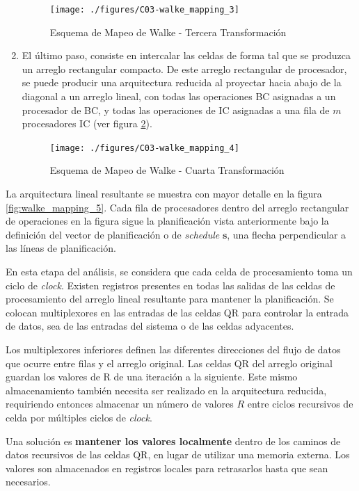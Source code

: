 \begin{enumerate}
	\begin{figure}[h!]
        \centering
        \texttt{[image: ./figures/C03-walke\_mapping\_3]}
        \caption{Esquema de Mapeo de Walke - Tercera Transformación}
        \label{fig:walke_mapping_3}
	\end{figure}

	\item  El último paso, consiste en intercalar las celdas de forma tal que se produzca un arreglo rectangular compacto. De este arreglo rectangular de procesador, se puede producir una arquitectura reducida al proyectar hacia abajo de la diagonal a un arreglo lineal, con todas las operaciones BC asignadas a un procesador de BC, y todas las operaciones de IC asignadas a una fila de $m$ procesadores IC (ver figura \ref{fig:walke_mapping_4}).

	\begin{figure}[h!]
        \centering
        \texttt{[image: ./figures/C03-walke\_mapping\_4]}
        \caption{Esquema de Mapeo de Walke - Cuarta Transformación}
        \label{fig:walke_mapping_4}
	\end{figure}
\end{enumerate}

La arquitectura lineal resultante se muestra con mayor detalle en la figura \ref{fig:walke_mapping_5}. Cada fila de procesadores dentro del arreglo rectangular de operaciones en la figura sigue la planificación vista anteriormente bajo la definición del vector de planificación o de \textit{schedule} $\mathbf{s}$, una flecha perpendicular a las líneas de planificación.

En esta etapa del análisis, se considera que cada celda de procesamiento toma un ciclo de \textit{clock}. Existen registros presentes en todas las salidas de las celdas de procesamiento del arreglo lineal resultante para mantener la planificación. Se colocan multiplexores en las entradas de las celdas QR para controlar la entrada de datos, sea de las entradas del sistema o de las celdas adyacentes.

Los multiplexores inferiores definen las diferentes direcciones del flujo de datos que ocurre entre filas y el arreglo original. Las celdas QR del arreglo original guardan los valores de R de una iteración a la siguiente. Este mismo almacenamiento también necesita ser realizado en la arquitectura reducida, requiriendo entonces almacenar un número de valores $R$ entre ciclos recursivos de celda por múltiples ciclos de \textit{clock}.

Una solución es \textbf{mantener los valores localmente} dentro de los caminos de datos recursivos de las celdas QR, en lugar de utilizar una memoria externa. Los valores son almacenados en registros locales para retrasarlos hasta que sean necesarios.

